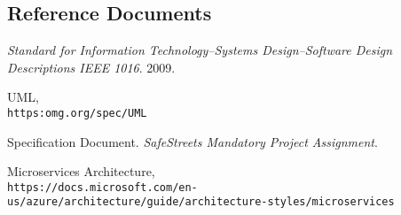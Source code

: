 \subsection{Reference Documents}
\begin{thebibliography}{9}
\textit{Standard for Information Technology--Systems Design--Software Design Descriptions IEEE 1016}. 
2009.

UML,
\\\texttt{https:omg.org/spec/UML}

Specification Document. 
\textit{SafeStreets Mandatory Project Assignment}. 

Microservices Architecture,
\\\texttt{https://docs.microsoft.com/en-us/azure/architecture/guide/architecture-styles/microservices}
\end{thebibliography}